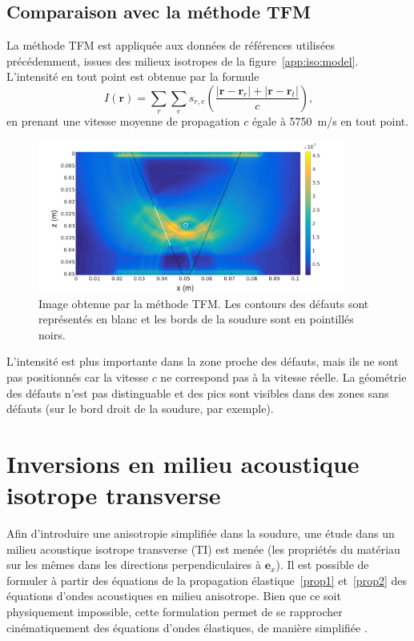 \subsection{Comparaison avec la méthode TFM}

La méthode TFM est appliquée aux données de références utilisées précédemment, issues des milieux isotropes de la figure~\ref{app:iso:model}. L'intensité en tout point est obtenue par la formule 
\begin{equation}
	I(\bm{r})= \displaystyle\sum_{r} \displaystyle\sum_{e} s_{r,e}\left( \frac{|\bm{r} - \bm{r}_r| + |\bm{r} - \bm{r}_t|}{c}\right) \text{,}
\end{equation}
en prenant une vitesse moyenne de propagation $c$ égale à 5750~m/s en tout point.

\begin{figure}[!h]
	\centering
	\includegraphics[height=5cm]{img/tfm_retouche.png}
	\caption{Image obtenue par la méthode TFM. Les contours des défauts sont représentés en blanc et les bords de la soudure sont en pointillés noirs.}
\end{figure}

L'intensité est plus importante dans la zone proche des défauts, mais ils ne sont pas positionnés car la vitesse $c$ ne correspond pas à la vitesse réelle. La géométrie des défauts n'est pas distinguable et des pics sont visibles dans des zones sans défauts (sur le bord droit de la soudure, par exemple).






\section{Inversions en milieu acoustique isotrope transverse }
Afin d'introduire une anisotropie simplifiée dans la soudure, une étude dans un milieu acoustique isotrope transverse (TI) est menée (les propriétés du matériau sur les mêmes dans les directions perpendiculaires à $\bm{e}_{x}$).
Il est possible de formuler à partir des équations de la propagation élastique~\ref{prop1} et~\ref{prop2} des équations d'ondes acoustiques en milieu anisotrope. Bien que ce soit physiquement impossible, cette formulation permet de se rapprocher cinématiquement des équations d'ondes élastiques, de manière simplifiée \citep{alkhalifah}.\\

